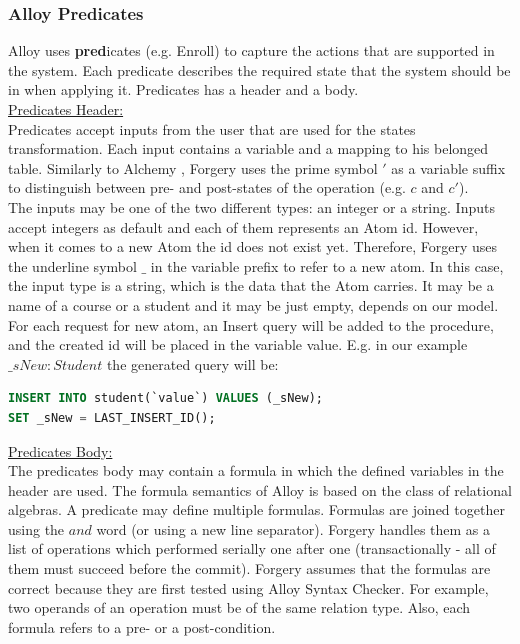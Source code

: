 \documentclass[oneside]{book}
\begin{document}
\newpage

\subsubsection{Alloy Predicates}

\noindent Alloy uses \textbf{pred}icates (e.g. Enroll) to capture the actions that are supported in the system. Each predicate describes the required state that the system should be in when applying it. Predicates has a header and a body. \\

\noindent\underline{Predicates Header:}\\

\noindent Predicates accept inputs from the user that are used for the states transformation. Each input contains a variable and a mapping to his belonged table. Similarly to Alchemy \cite{alchemy}, Forgery uses the prime symbol $'$ as a variable suffix to distinguish between pre- and post-states of the operation (e.g. $c$ and $c'$).\\

\noindent The inputs may be one of the two different types: an integer or a string. Inputs accept integers as default and each of them represents an Atom id. However, when it comes to a new Atom the id does not exist yet. Therefore, Forgery uses the underline symbol $\_$ in the variable prefix to refer to a new atom. In this case, the input type is a string, which is the data that the Atom carries. It may be a name of a course or a student and it may be just empty, depends on our model.\\

For each request for new atom, an Insert query will be added to the procedure, and the created id will be placed in the variable value. E.g. in our example $\_sNew : Student$ the generated query will be:
\begin{lstlisting}[escapechar=@,language=SQL]
INSERT INTO student(`value`) VALUES (_sNew);
SET _sNew = LAST_INSERT_ID();
\end{lstlisting}

\noindent\underline{Predicates Body:}\\

\noindent The predicates body may contain a formula in which the defined variables in the header are used. 
The formula semantics of Alloy is based on the class of relational algebras. A predicate may define multiple formulas. Formulas are joined together using the $and$ word (or using a new line separator). Forgery handles them as a list of operations which performed serially one after one (transactionally - all of them must succeed before the commit). Forgery assumes that the formulas are correct because they are first tested using Alloy Syntax Checker. For example, two operands of an operation must be of the same relation type. Also, each formula refers to a pre- or a post-condition.\\
\end{document}
